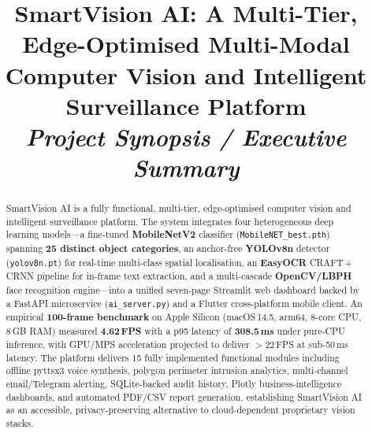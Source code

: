 \documentclass[conference]{IEEEtran}
\begin{document}
\title{%
    SmartVision AI: A Multi-Tier, Edge-Optimised Multi-Modal\\
    Computer Vision and Intelligent Surveillance Platform\\
    \large\textit{Project Synopsis / Executive Summary}
}

\author{
}

\maketitle

\begin{abstract}
SmartVision AI is a fully functional, multi-tier, edge-optimised computer
vision and intelligent surveillance platform. The system integrates four
heterogeneous deep learning models—a fine-tuned \textbf{MobileNetV2}
classifier (\texttt{MobileNET\_best.pth}) spanning \textbf{25 distinct object
categories}, an anchor-free \textbf{YOLOv8n} detector
(\texttt{yolov8n.pt}) for real-time multi-class spatial localisation, an
\textbf{EasyOCR} CRAFT\,+\,CRNN pipeline for in-frame text extraction, and
a multi-cascade \textbf{OpenCV/LBPH} face recognition engine—into a
unified seven-page Streamlit web dashboard backed by a FastAPI microservice
(\texttt{ai\_server.py}) and a Flutter cross-platform mobile client. An
empirical \textbf{100-frame benchmark} on Apple Silicon (macOS\,14.5,
arm64, 8-core CPU, 8\,GB RAM) measured \textbf{4.62\,FPS} with a p95
latency of \textbf{308.5\,ms} under pure-CPU inference, with GPU/MPS
acceleration projected to deliver $>\!22$\,FPS at sub-50\,ms latency.
The platform delivers 15 fully implemented functional modules including
offline pyttsx3 voice synthesis, polygon perimeter intrusion analytics,
multi-channel email/Telegram alerting, SQLite-backed audit history, Plotly
business-intelligence dashboards, and automated PDF/CSV report generation,
establishing SmartVision AI as an accessible, privacy-preserving alternative
to cloud-dependent proprietary vision stacks.
\end{abstract}
\end{document}
